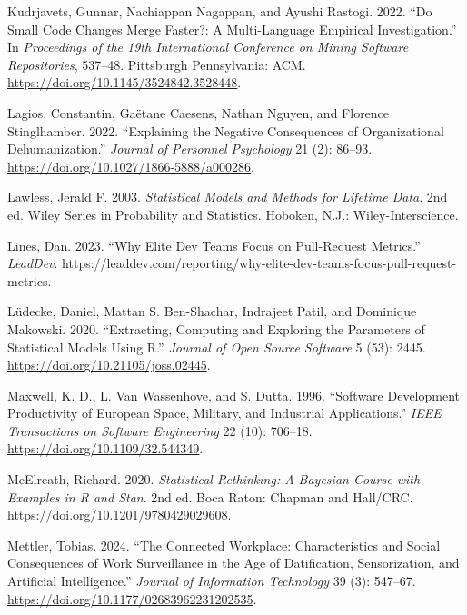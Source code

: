 \documentclass[
]{article}
\newlength{\cslhangindent}
\newenvironment{CSLReferences}[2] %
 {\begin{list}{}{%
  \setlength{\itemindent}{0pt}
  \setlength{\leftmargin}{0pt}
  \setlength{\parsep}{0pt}
  \ifodd #1
   \setlength{\leftmargin}{\cslhangindent}
   \setlength{\itemindent}{-1\cslhangindent}
  \fi
  \setlength{\itemsep}{#2\baselineskip}}}
 {\end{list}}
\begin{document}
\begin{CSLReferences}{1}{0}
Kudrjavets, Gunnar, Nachiappan Nagappan, and Ayushi Rastogi. 2022. {``Do
Small Code Changes Merge Faster?: A Multi-Language Empirical
Investigation.''} In \emph{Proceedings of the 19th {International
Conference} on {Mining Software Repositories}}, 537--48. Pittsburgh
Pennsylvania: ACM. \url{https://doi.org/10.1145/3524842.3528448}.

Lagios, Constantin, Gaëtane Caesens, Nathan Nguyen, and Florence
Stinglhamber. 2022. {``Explaining the {Negative Consequences} of
{Organizational} {Dehumanization}.''} \emph{Journal of Personnel
Psychology} 21 (2): 86--93.
\url{https://doi.org/10.1027/1866-5888/a000286}.

Lawless, Jerald F. 2003. \emph{Statistical Models and Methods for
Lifetime Data}. 2nd ed. Wiley Series in Probability and Statistics.
Hoboken, N.J.: Wiley-Interscience.

Lines, Dan. 2023. {``Why Elite Dev Teams Focus on Pull-Request
Metrics.''} \emph{LeadDev}.
https://leaddev.com/reporting/why-elite-dev-teams-focus-pull-request-metrics.

Lüdecke, Daniel, Mattan S. Ben-Shachar, Indrajeet Patil, and Dominique
Makowski. 2020. {``Extracting, Computing and Exploring the Parameters of
Statistical Models Using {R}.''} \emph{Journal of Open Source Software}
5 (53): 2445. \url{https://doi.org/10.21105/joss.02445}.

Maxwell, K. D., L. Van Wassenhove, and S. Dutta. 1996. {``Software
Development Productivity of {European} Space, Military, and Industrial
Applications.''} \emph{IEEE Transactions on Software Engineering} 22
(10): 706--18. \url{https://doi.org/10.1109/32.544349}.

McElreath, Richard. 2020. \emph{Statistical {Rethinking}: {A Bayesian
Course} with {Examples} in {R} and {Stan}}. 2nd ed. Boca Raton: {Chapman
and Hall/CRC}. \url{https://doi.org/10.1201/9780429029608}.

Mettler, Tobias. 2024. {``The Connected Workplace: {Characteristics} and
Social Consequences of Work Surveillance in the Age of Datification,
Sensorization, and Artificial Intelligence.''} \emph{Journal of
Information Technology} 39 (3): 547--67.
\url{https://doi.org/10.1177/02683962231202535}.


\end{CSLReferences}
\end{document}
